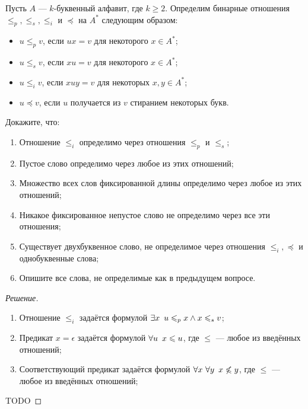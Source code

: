     \begin{problem}[4]
        Пусть \(A\) --- \(k\)-буквенный алфавит, где \(k \geqslant 2\). Определим бинарные отношения \(\leqslant_p, \leqslant_s, \leqslant_i\) и \(\preceq\) на \(A^*\) следующим образом:
        \begin{itemize}
            \item \(u \leqslant_p v\), если \(ux = v\) для некоторого \(x \in A^*\);
            \item \(u \leqslant_s v\), если \(xu = v\) для некоторого \(x \in A^*\);
            \item \(u \leqslant_i v\), если \(xuy = v\) для некоторых \(x, y \in A^*\);
            \item \(u \preceq v\), если \(u\) получается из \(v\) стиранием некоторых букв.
        \end{itemize}
        Докажите, что:
        \begin{enumerate}
            \item Отношение \(\leqslant_i\) определимо через отношения \(\leqslant_p\) и \(\leqslant_s\);
            \item Пустое слово определимо через любое из этих отношений;
            \item Множество всех слов фиксированной длины определимо через любое из этих отношений;
            \item Никакое фиксированное непустое слово не определимо через все эти отношения;
            \item Существует двухбуквенное слово, не определимое через отношения \(\leqslant_i, \preceq\) и однобуквенные слова;
            \item Опишите все слова, не определимые как в предыдущем вопросе.
        \end{enumerate}
    \end{problem}
    \begin{proof}[Решение]
        \begin{enumerate}
            \item Отношение \(\leqslant_i\) задаётся формулой \(\exists x \enskip u \leqslant_p x \land x \leqslant_s v\);
            \item Предикат \(x = \epsilon\) задаётся формулой \(\forall u \enskip x \leqslant u\), где \(\leqslant\) --- любое из введённых отношений;
            \item Соответствующий предикат задаётся формулой \(\forall x \ \forall y \enskip x \not\leqslant y\), где \(\leqslant\) --- любое из введённых отношений;
        \end{enumerate}
        TODO
    \end{proof}

